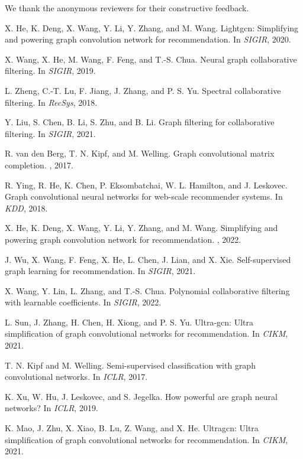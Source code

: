 \documentclass[10pt,twocolumn,letterpaper]{article}
\begin{document}
We thank the anonymous reviewers for their constructive feedback.

\begin{thebibliography}{99}
X. He, K. Deng, X. Wang, Y. Li, Y. Zhang, and M. Wang.
\newblock Lightgcn: Simplifying and powering graph convolution network for recommendation.
\newblock In {\em SIGIR}, 2020.

X. Wang, X. He, M. Wang, F. Feng, and T.-S. Chua.
\newblock Neural graph collaborative filtering.
\newblock In {\em SIGIR}, 2019.

L. Zheng, C.-T. Lu, F. Jiang, J. Zhang, and P. S. Yu.
\newblock Spectral collaborative filtering.
\newblock In {\em RecSys}, 2018.

Y. Liu, S. Chen, B. Li, S. Zhu, and B. Li.
\newblock Graph filtering for collaborative filtering.
\newblock In {\em SIGIR}, 2021.

R. van den Berg, T. N. Kipf, and M. Welling.
\newblock Graph convolutional matrix completion.
, 2017.

R. Ying, R. He, K. Chen, P. Eksombatchai, W. L. Hamilton, and J. Leskovec.
\newblock Graph convolutional neural networks for web-scale recommender systems.
\newblock In {\em KDD}, 2018.

X. He, K. Deng, X. Wang, Y. Li, Y. Zhang, and M. Wang.
\newblock Simplifying and powering graph convolution network for recommendation.
, 2022.

J. Wu, X. Wang, F. Feng, X. He, L. Chen, J. Lian, and X. Xie.
\newblock Self-supervised graph learning for recommendation.
\newblock In {\em SIGIR}, 2021.

X. Wang, Y. Lin, L. Zhang, and T.-S. Chua.
\newblock Polynomial collaborative filtering with learnable coefficients.
\newblock In {\em SIGIR}, 2022.

L. Sun, J. Zhang, H. Chen, H. Xiong, and P. S. Yu.
\newblock Ultra-gcn: Ultra simplification of graph convolutional networks for recommendation.
\newblock In {\em CIKM}, 2021.

T. N. Kipf and M. Welling.
\newblock Semi-supervised classification with graph convolutional networks.
\newblock In {\em ICLR}, 2017.

K. Xu, W. Hu, J. Leskovec, and S. Jegelka.
\newblock How powerful are graph neural networks?
\newblock In {\em ICLR}, 2019.

K. Mao, J. Zhu, X. Xiao, B. Lu, Z. Wang, and X. He.
\newblock Ultragcn: Ultra simplification of graph convolutional networks for recommendation.
\newblock In {\em CIKM}, 2021.

\end{thebibliography}
\end{document}
